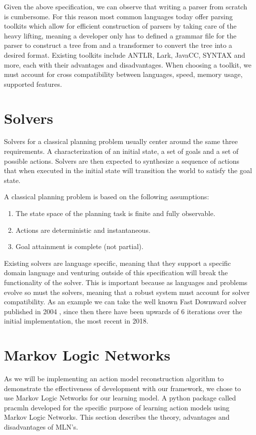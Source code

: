 Given the above specification, we can observe that writing a parser from scratch is cumbersome. For this reason most common languages today offer parsing toolkits which allow for efficient construction of parsers by taking care of the heavy lifting, meaning a developer only has to defined a grammar file for the parser to construct a tree from and a transformer to convert the tree into a desired format. Existing toolkits include ANTLR, Lark, JavaCC, SYNTAX and more, each with their advantages and disadvantages. When choosing a toolkit, we must account for cross compatibility between languages, speed, memory usage, supported features.
\newpage


\section{Solvers}

Solvers for a classical planning problem usually center around the same three requirements. A characterization of an initial state, a set of goals and a set of possible actions. Solvers are then expected to synthesize a sequence of actions that when executed in the initial state will transition the world to satisfy the goal state.

A classical planning problem is based on the following assumptions:
\begin{enumerate}
    \item  The state space of the planning task is finite and fully observable.
    \item Actions are deterministic and instantaneous.
    \item Goal attainment is complete (not partial).
\end{enumerate}

Existing solvers are language specific, meaning that they support a specific domain language and venturing outside of this specification will break the functionality of the solver. This is important because as languages and problems evolve so must the solvers, meaning that a robust system must account for solver compatibility. As an example we can take the well known Fast Downward solver published in 2004 \cite{FastDown46:online}, since then there have been upwards of 6 iterations over the initial implementation, the most recent in 2018.


\section{Markov Logic Networks}
As we will be implementing an action model reconstruction algorithm to demonstrate the effectiveness of development with our framework, we chose to use Markov Logic Networks for our learning model. A python package called pracmln \cite{pracmln} developed for the specific purpose of learning action models using Markov Logic Networks. This section describes the theory, advantages and disadvantages of MLN's.

